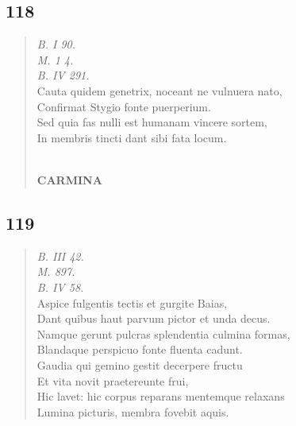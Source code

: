 \documentclass[11pt, a4paper]{report}
\begin{document}
            \subsection*{118}
      \begin{verse}
      \textit{B. I 90.} \\ \textit{M. 1 4.} \\ \textit{B. IV 291.} \\ Cauta quidem genetrix, noceant ne vulnuera nato, \\ Confirmat Stygio fonte puerperium. \\ Sed quia fas nulli est humanam vincere sortem, \\ In membris tincti dant sibi fata locum. \\ 
        ﻿\pagebreak 
    \begin{center} \textbf{CARMINA} \end{center} \marginpar{[134]} 
      \end{verse}
  
            \subsection*{119}
      \begin{verse}
      \textit{B. III 42.} \\ \textit{M. 897.} \\ \textit{B. IV 58.} \\ Aspice fulgentis tectis et gurgite Baias, \\ Dant quibus haut parvum pictor et unda decus. \\ Namque gerunt pulcras splendentia culmina formas, \\ Blandaque perspicuo fonte fluenta cadunt. \\ Gaudia qui gemino gestit decerpere fructu \\ Et vita novit praetereunte frui, \\ Hic lavet: hic corpus reparans mentemque relaxans \\ Lumina picturis, membra fovebit aquis. \\ 
      \end{verse}
  
\end{document}
